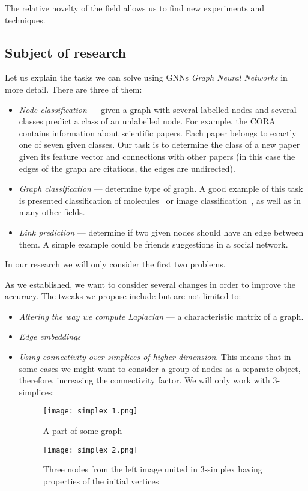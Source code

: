     The relative novelty of the field allows us to find new experiments and techniques.

\subsection{Subject of research}
Let us explain the tasks we can solve using GNNs \emph{Graph Neural Networks} in more detail.
    There are three of them:
    \begin{itemize}
        \item \textit{Node classification} --- given a graph with several labelled nodes and several classes predict a class of an unlabelled node.
            For example, the CORA~\cite{cora_dataset} contains information about scientific papers.
            Each paper belongs to exactly one of seven given classes.
            Our task is to determine the class of a new paper given its feature vector and connections with other papers (in this case the edges of the graph are citations, the edges are undirected).
        \item \textit{Graph classification} --- determine type of graph.
            A good example of this task is presented classification of molecules~\cite{how_powerful_are_gnns} or image classification~\cite{benchmarking_gnns}, as well as in many other fields.
        \item \textit{Link prediction} --- determine if two given nodes should have an edge between them.
            A simple example could be friends suggestions in a social network.
    \end{itemize}

    In our research we will only consider the first two problems.

    As we established, we want to consider several changes in order to improve the accuracy.
    The tweaks we propose include but are not limited to:
    \begin{itemize}
        \item \textit{Altering the way we compute Laplacian} --- a characteristic matrix of a graph.
        \item \textit{Edge embeddings}
        \item \textit{Using connectivity over simplices of higher dimension}. This means that in some cases we might want to consider a group of nodes as a separate object, therefore, increasing the connectivity factor. We will only work with 3-simplices:
            \begin{figure}[h]
                \begin{multicols}{2}
                    \centering
                    \texttt{[image: simplex\_1.png]}
                    \caption{A part of some graph}\label{fig:clique_merged}
        
                    \centering
                    \texttt{[image: simplex\_2.png]}
                    \caption{Three nodes from the left image united in 3-simplex having properties of the initial vertices}
                \end{multicols}
            \end{figure}
    \end{itemize}

